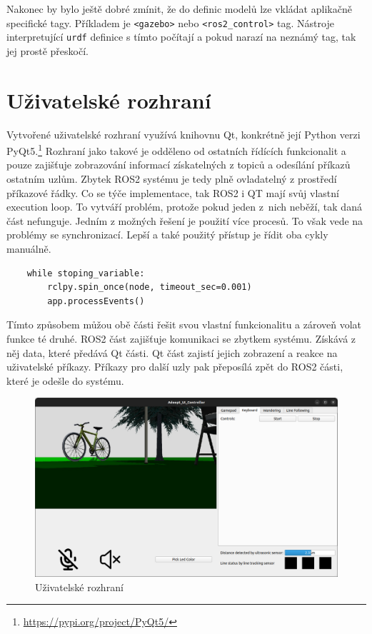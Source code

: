 Nakonec by bylo ještě dobré zmínit, že do definic modelů lze vkládat aplikačně specifické tagy. Příkladem je \verb|<gazebo>| nebo \verb|<ros2_control>| tag. Nástroje interpretující \verb|urdf| definice s tímto počítají a pokud narazí na neznámý tag, tak jej prostě přeskočí.

\newpage
\section{Uživatelské rozhraní}
Vytvořené uživatelské rozhraní využívá knihovnu Qt, konkrétně její Python verzi PyQt5.\footnote{\url{https://pypi.org/project/PyQt5/}} Rozhraní jako takové je odděleno od ostatních řídících funkcionalit a pouze zajišťuje zobrazování informací získatelných z topiců a odesílání příkazů ostatním uzlům. Zbytek ROS2 systému je tedy plně ovladatelný z prostředí příkazové řádky. Co se týče implementace, tak ROS2 i QT mají svůj vlastní execution loop. To vytváří problém, protože pokud jeden z~nich neběží, tak daná část nefunguje. Jedním z možných řešení je použití více procesů. To však vede na problémy se synchronizací. Lepší a také použitý přístup je řídit oba cykly manuálně. 
\begin{verbatim}
	while stoping_variable:
	    rclpy.spin_once(node, timeout_sec=0.001)
	    app.processEvents()
\end{verbatim}
Tímto způsobem můžou obě části řešit svou vlastní funkcionalitu a zároveň volat funkce té druhé. ROS2 část zajišťuje komunikaci se zbytkem systému. Získává z něj data, které předává Qt části. Qt část zajistí jejich zobrazení a reakce na uživatelské příkazy. Příkazy pro další uzly pak přeposílá zpět do ROS2 části, které je odešle do systému.

\begin{figure}[h!]
	\centering
	\includegraphics[scale=0.3]{obrazky-figures/ui.png}
	\caption{Uživatelské rozhraní}
	\label{fig:ui}
\end{figure}

